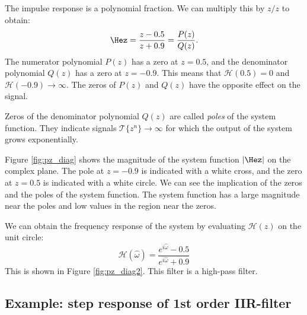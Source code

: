 The impulse response is a polynomial fraction. We can multiply this by
$z/z$ to obtain:
\begin{equation}
\Hez = \frac{z-0.5}{z+0.9} = \frac{P(z)}{Q(z)}.
\label{eq:example_iir_system_hpf}
\end{equation}
The numerator polynomial $P(z)$ has a zero at $z=0.5$, and the
denominator polynomial $Q(z)$ has a zero at $z=-0.9$. This means that
$\mathcal{H}(0.5)=0$ and $\mathcal{H}(-0.9)\rightarrow \infty$. The
zeros of $P(z)$ and $Q(z)$ have the opposite effect on the signal.

Zeros of the denominator polynomial $Q(z)$ are called \emph{poles} of
the system function. They indicate signals
$\mathcal{T}\{z^{n}\} \rightarrow \infty$ for which the output of the
system grows exponentially.


Figure \ref{fig:pz_diag} shows the magnitude of the system function $|\Hez|$
on the complex plane. The pole at $z=-0.9$ is indicated with a white
cross, and the zero at $z=0.5$ is indicated with a white circle. We
can see the implication of the zeros and the poles of the system
function. The system function has a large magnitude near the poles and low values in the region near the zeros.

We can obtain the frequency response of the system by evaluating
$\mathcal{H}(z)$ on the unit circle:
\begin{equation}
\mathcal{H}(\hat{\omega}) = \frac{e^{i\hat{\omega}}-0.5}{e^{i\hat{\omega}}+0.9}
\end{equation}
This is shown in Figure \ref{fig:pz_diag2}. This filter is a high-pass
filter.




\subsection{Example: step response of 1st order IIR-filter}

